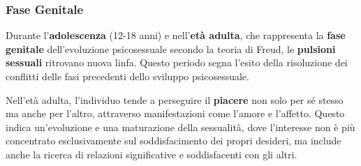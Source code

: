 \documentclass{subfiles}
\begin{document}
\subsubsection{Fase Genitale}
Durante l'\textbf{adolescenza} (12-18 anni) e nell'\textbf{età adulta}, che rappresenta la 
\textbf{fase genitale} dell'evoluzione psicosessuale secondo la teoria di Freud, le 
\textbf{pulsioni sessuali} ritrovano nuova linfa. Questo periodo segna l'esito della 
risoluzione dei conflitti delle fasi precedenti dello sviluppo psicosessuale.

Nell'età adulta, l'individuo tende a perseguire il \textbf{piacere} non solo per sé stesso 
ma anche per l'altro, attraverso manifestazioni come l'amore e l'affetto. 
Questo indica un'evoluzione e una maturazione della sessualità, dove l'interesse non è più 
concentrato esclusivamente sul soddisfacimento dei propri desideri, ma include anche la 
ricerca di relazioni significative e soddisfacenti con gli altri.\\
\end{document}
